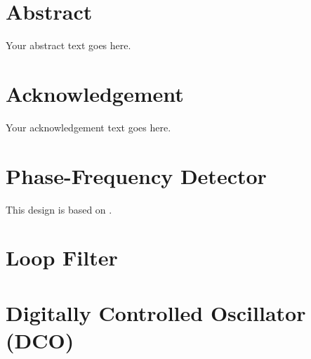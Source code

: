 \documentclass[12pt, twoside]{book}
\begin{document}
\chapter*{Abstract}
Your abstract text goes here.

\chapter*{Acknowledgement}
Your acknowledgement text goes here.

\tableofcontents

\listoftables
{}

\listoffigures
{}

\mainmatter
\onehalfspacing

\chapter{Phase-Frequency Detector}
This design is based on \cite{key2}.

\chapter{Loop Filter}

\chapter{Digitally Controlled Oscillator (DCO)}

\end{document}

